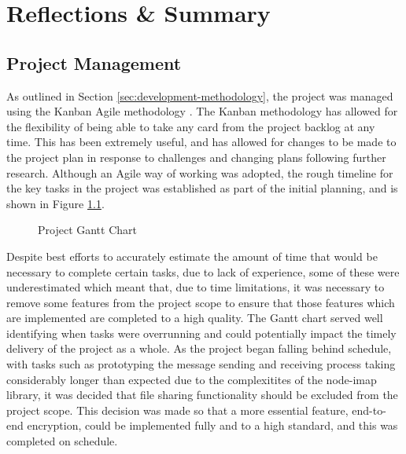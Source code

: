\chapter{Reflections \& Summary}




\section{Project Management}\label{sec:reflection-on-planning}

As outlined in Section \ref{sec:development-methodology}, the project was managed using the Kanban Agile methodology \cite{stellman2014learning}. The Kanban methodology has allowed for the flexibility of being able to take any card from the project backlog at any time. This has been extremely useful, and has allowed for changes to be made to the project plan in response to challenges and changing plans following further research. Although an Agile way of working was adopted, the rough timeline for the key tasks in the project was established as part of the initial planning, and is shown in Figure \ref{fig:gantt}.

\begin{figure}[h!]
  \centering
  \caption{Project Gantt Chart}
  \label{fig:gantt}
\end{figure}

Despite best efforts to accurately estimate the amount of time that would be necessary to complete certain tasks, due to lack of experience, some of these were underestimated which meant that, due to time limitations, it was necessary to remove some features from the project scope to ensure that those features which are implemented are completed to a high quality. The Gantt chart served well identifying when tasks were overrunning and could potentially impact the timely delivery of the project as a whole. As the project began falling behind schedule, with tasks such as prototyping the message sending and receiving process taking considerably longer than expected due to the complexitites of the node-imap library, it was decided that file sharing functionality should be excluded from the project scope. This decision was made so that a more essential feature, end-to-end encryption, could be implemented fully and to a high standard, and this was completed on schedule.

